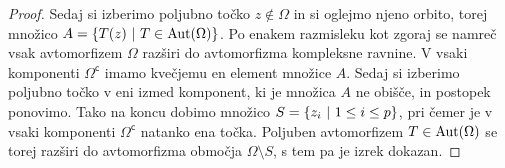 \begin{proof}


Sedaj si izberimo poljubno točko $z \not \in \Omega$ in si oglejmo
njeno orbito, torej množico $A = \left\{T(z)~\middle\vert~T \in \operatorname{Aut}(\Omega)\right\}$.
Po enakem razmisleku kot zgoraj se namreč vsak avtomorfizem
$\Omega$ razširi do avtomorfizma kompleksne ravnine. V vsaki
komponenti $\Omega^\mathsf{c}$ imamo kvečjemu en element množice
$A$. Sedaj si izberimo poljubno točko v eni izmed komponent, ki je
množica $A$ ne obišče, in postopek ponovimo. Tako na koncu dobimo
množico $S = \left\{z_i~\middle\vert~1 \leq i \leq p\right\}$, pri čemer je v vsaki
komponenti $\Omega^\mathsf{c}$ natanko ena točka. Poljuben
avtomorfizem $T \in \operatorname{Aut}(\Omega)$ se torej razširi do avtomorfizma
območja $\Omega \setminus S$, s tem pa je izrek dokazan.
\end{proof}
